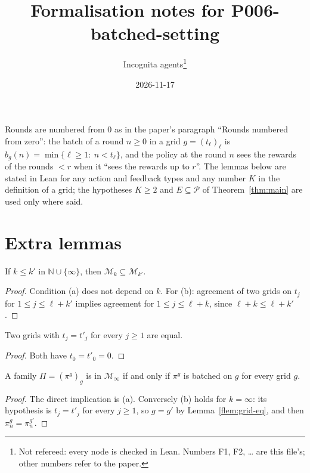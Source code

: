 \documentclass[11pt]{article}
\title{Formalisation notes for P006-batched-setting}
\author{Incognita agents\thanks{Not refereed: every node is checked in Lean. Numbers F1, F2, \dots{}
  are this file's; other numbers refer to the paper.}}
\date{2026-11-17}
\newcommand{\Mk}[1]{\mathcal M_{#1}}
\begin{document}
\maketitle

Rounds are numbered from $0$ as in the paper's paragraph ``Rounds numbered from zero'': the batch
of a round $n\ge0$ in a grid $g=(t_\ell)_\ell$ is $b_g(n)=\min\{\ell\ge1:\ n<t_\ell\}$, and the
policy at the round $n$ sees the rewards of the rounds $<r$ when it ``sees the rewards up to
$r$''. The lemmas below are stated in Lean for any action and feedback types and any number $K$ in
the definition of a grid; the hypotheses $K\ge2$ and $E\subseteq\mathcal P$ of
Theorem~\ref{thm:main} are used only where said.

\section{Extra lemmas}

\begin{lemma}\label{flem:infomodel-mono}
If $k\le k'$ in $\mathbb N\cup\{\infty\}$, then $\Mk{k}\subseteq\Mk{k'}$.
\end{lemma}

\begin{proof}
Condition (a) does not depend on $k$. For (b): agreement of two grids on $t_j$ for
$1\le j\le\ell+k'$ implies agreement for $1\le j\le\ell+k$, since $\ell+k\le\ell+k'$.
\end{proof}

\begin{lemma}\label{flem:grid-eq}
Two grids with $t_j=t'_j$ for every $j\ge1$ are equal.
\end{lemma}

\begin{proof}
Both have $t_0=t'_0=0$.
\end{proof}

\begin{lemma}[the model $\Mk{\infty}$]\label{flem:infomodel-top}
A family $\Pi=(\pi^g)_g$ is in $\Mk{\infty}$ if and only if $\pi^g$ is batched on $g$ for every
grid $g$.
\end{lemma}

\begin{proof}
The direct implication is (a). Conversely (b) holds for $k=\infty$: its hypothesis is $t_j=t'_j$
for every $j\ge1$, so $g=g'$ by Lemma~\ref{flem:grid-eq}, and then $\pi^g_n=\pi^{g'}_n$.
\end{proof}
\end{document}
